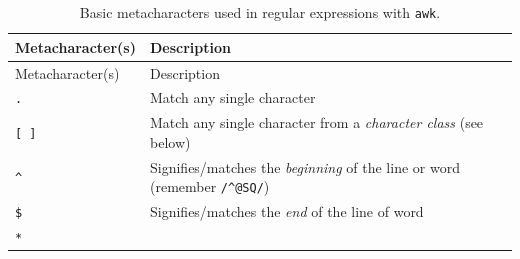 \documentclass[]{krantz}
\begin{document}
\begin{longtable}[]{@{}ll@{}}
\caption{\label{tab:metachars} Basic metacharacters used in regular expressions with \texttt{awk}.}\tabularnewline
\toprule
\begin{minipage}[b]{0.25\columnwidth}\raggedright
Metacharacter(s)\strut
\end{minipage} & \begin{minipage}[b]{0.43\columnwidth}\raggedright
Description\strut
\end{minipage}\tabularnewline
\midrule
\endfirsthead
\toprule
\begin{minipage}[b]{0.25\columnwidth}\raggedright
Metacharacter(s)\strut
\end{minipage} & \begin{minipage}[b]{0.43\columnwidth}\raggedright
Description\strut
\end{minipage}\tabularnewline
\midrule
\endhead
\begin{minipage}[t]{0.25\columnwidth}\raggedright
\texttt{.}\strut
\end{minipage} & \begin{minipage}[t]{0.43\columnwidth}\raggedright
Match any single character\strut
\end{minipage}\tabularnewline
\begin{minipage}[t]{0.25\columnwidth}\raggedright
\texttt{{[}\ {]}}\strut
\end{minipage} & \begin{minipage}[t]{0.43\columnwidth}\raggedright
Match any single character
from a \emph{character class} (see
below)\strut
\end{minipage}\tabularnewline
\begin{minipage}[t]{0.25\columnwidth}\raggedright
\texttt{\^{}}\strut
\end{minipage} & \begin{minipage}[t]{0.43\columnwidth}\raggedright
Signifies/matches the
\emph{beginning} of the line or
word (remember \texttt{/\^{}@SQ/})\strut
\end{minipage}\tabularnewline
\begin{minipage}[t]{0.25\columnwidth}\raggedright
\texttt{\$}\strut
\end{minipage} & \begin{minipage}[t]{0.43\columnwidth}\raggedright
Signifies/matches the \emph{end} of
the line of word\strut
\end{minipage}\tabularnewline
\begin{minipage}[t]{0.25\columnwidth}\raggedright
\texttt{*}\strut

\end{minipage}
\end{longtable}
\end{document}
